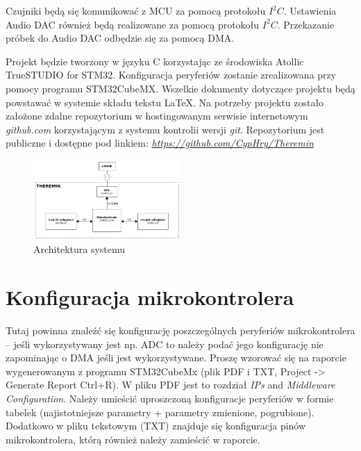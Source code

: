 \documentclass[10pt, a4paper]{article}
\begin{document}
Czujniki będą się komunikować z MCU za pomocą protokołu $I^2C$. Ustawienia Audio DAC również będą realizowane za pomocą protokołu $I^2C$. Przekazanie próbek do Audio DAC odbędzie się za pomocą DMA.


Projekt będzie tworzony w języku C korzystając ze środowiska Atollic TrueSTUDIO for STM32. Konfiguracja peryferiów zostanie zrealizowana przy pomocy programu STM32CubeMX. Wszelkie dokumenty dotyczące projektu będą powstawać w systemie składu tekstu \LaTeX. Na potrzeby projektu zostało założone zdalne repozytorium w hostingowanym serwisie internetowym \textit{github.com} korzystającym z systemu kontrolii wersji \textit{git}. Repozytorium jest publiczne i dostępne pod linkiem: \href{https://cyphry.github.io/dron/}{\textit{https://github.com/CypHry/Theremin}}
\begin{figure}[H]
	\centering
	\includegraphics[width=0.5\textwidth]{architektura.png}
	\caption{Architektura systemu}
	\label{fig:Architektura}
\end{figure}



 
\section{Konfiguracja mikrokontrolera}

Tutaj powinna znaleźć się konfigurację poszczególnych peryferiów 
mikrokontrolera -- jeśli wykorzystywany jest np. ADC to należy 
podać jego konfigurację nie zapominając o DMA jeśli jest 
wykorzystywane. Proszę wzorować się na raporcie wygenerowanym 
z programu STM32CubeMx 
(plik PDF i TXT, Project -> Generate Report Ctrl+R). 
W pliku PDF jest to rozdział \textit{IPs} and \textit{Middleware Configuration}. 
Należy umieścić uproszczoną konfiguracje peryferiów w formie 
tabelek (najistotniejsze parametry + parametry zmienione, pogrubione).
Dodatkowo w pliku tekstowym (TXT) znajduje się konfiguracja pinów 
mikrokontrolera, którą również należy zamieścić w raporcie.
\end{document}
